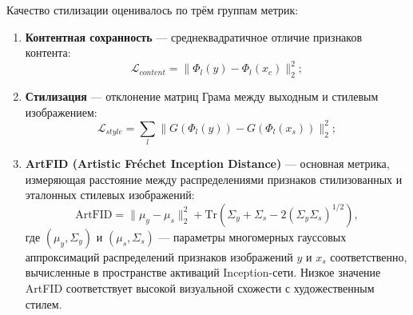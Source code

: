 \documentclass{article}
\begin{document}
Качество стилизации оценивалось по трём группам метрик:
\begin{enumerate}
    \item \textbf{Контентная сохранность} — среднеквадратичное отличие признаков контента:  
    $$
    \mathcal{L}_{content} = \| \Phi_l(y) - \Phi_l(x_c) \|_2^2;
    $$
    \item \textbf{Стилизация} — отклонение матриц Грама между выходным и стилевым изображением:  
    $$
    \mathcal{L}_{style} = \sum_l \| G(\Phi_l(y)) - G(\Phi_l(x_s)) \|_2^2;
    $$
    \item \textbf{ArtFID (Artistic Fréchet Inception Distance)} — основная метрика, измеряющая расстояние между распределениями признаков стилизованных и эталонных стилевых изображений:
    $$
    \text{ArtFID} = \| \mu_y - \mu_s \|_2^2 + \mathrm{Tr}\left( \Sigma_y + \Sigma_s - 2(\Sigma_y \Sigma_s)^{1/2} \right),
    $$
    где $(\mu_y, \Sigma_y)$ и $(\mu_s, \Sigma_s)$ — параметры многомерных гауссовых аппроксимаций распределений признаков изображений $y$ и $x_s$ соответственно, вычисленные в пространстве активаций Inception-сети.  
    Низкое значение ArtFID соответствует высокой визуальной схожести с художественным стилем.
\end{enumerate}





\end{document}
